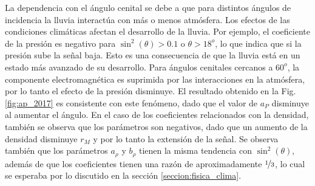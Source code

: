         La dependencia con el ángulo cenital se debe a que para distintos ángulos de incidencia la lluvia interactúa con más o menos atmósfera. Los efectos de las condiciones climáticas afectan el desarrollo de la lluvia. Por ejemplo, el coeficiente de la presión  es negativo para $\sin^2(\theta)>0.1$ o $\theta>18^o$, lo que indica que si la presión sube la señal baja. Esto es una consecuencia de que la lluvia  está en un estado más avanzado de su desarrollo. Para ángulos cenitales cercanos a $60^o$, la componente electromagnética es suprimida por las interacciones en la atmósfera, por lo tanto el efecto de la presión disminuye. El resultado obtenido en la Fig.\,\ref{fig:ap_2017} es consistente con este fenómeno, dado que el valor de $a_P$ disminuye al aumentar el ángulo. 		En el caso de los coeficientes relacionados con la densidad, también se observa que los parámetros son negativos, dado que un aumento de la densidad disminuye $r_M$ y por lo tanto la extensión de la señal. Se observa también que los parámetros $a_\rho$ y $b_\rho$ tienen la misma tendencia con $\sin^2(\theta)$, además de que los coeficientes tienen una razón de aproximadamente $\nicefrac{1}{3}$, lo cual se esperaba por lo discutido en la sección \ref{seccion:fisica_clima}.
